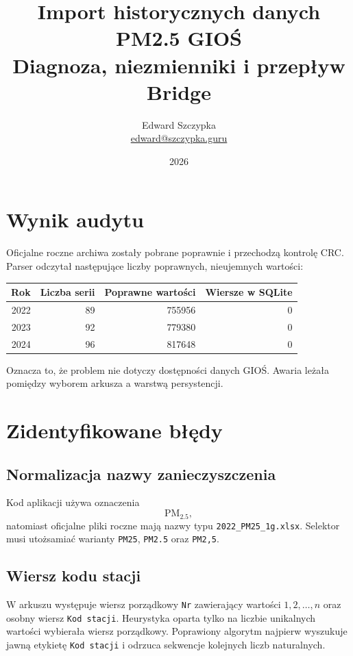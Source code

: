 \documentclass[11pt,a4paper]{article}
\title{Import historycznych danych PM2.5 GIOŚ\\
Diagnoza, niezmienniki i przepływ Bridge}
\author{Edward Szczypka\\\href{mailto:edward@szczypka.guru}{edward@szczypka.guru}}
\date{2026}
\begin{document}
\maketitle

\section{Wynik audytu}

Oficjalne roczne archiwa zostały pobrane poprawnie i przechodzą kontrolę CRC.
Parser odczytał następujące liczby poprawnych, nieujemnych wartości:

\begin{center}
\begin{tabular}{rrrr}
\toprule
Rok & Liczba serii & Poprawne wartości & Wiersze w SQLite\\
\midrule
2022 & 89 & 755956 & 0\\
2023 & 92 & 779380 & 0\\
2024 & 96 & 817648 & 0\\
\bottomrule
\end{tabular}
\end{center}

Oznacza to, że problem nie dotyczy dostępności danych GIOŚ. Awaria leżała
pomiędzy wyborem arkusza a warstwą persystencji.

\section{Zidentyfikowane błędy}

\subsection{Normalizacja nazwy zanieczyszczenia}

Kod aplikacji używa oznaczenia
\[
  \mathrm{PM}_{2.5},
\]
natomiast oficjalne pliki roczne mają nazwy typu
\texttt{2022\_PM25\_1g.xlsx}. Selektor musi utożsamiać warianty
\texttt{PM25}, \texttt{PM2.5} oraz \texttt{PM2,5}.

\subsection{Wiersz kodu stacji}

W arkuszu występuje wiersz porządkowy \texttt{Nr} zawierający wartości
$1,2,\ldots,n$ oraz osobny wiersz \texttt{Kod stacji}. Heurystyka oparta tylko
na liczbie unikalnych wartości wybierała wiersz porządkowy. Poprawiony algorytm
najpierw wyszukuje jawną etykietę \texttt{Kod stacji} i odrzuca sekwencje
kolejnych liczb naturalnych.
\end{document}
